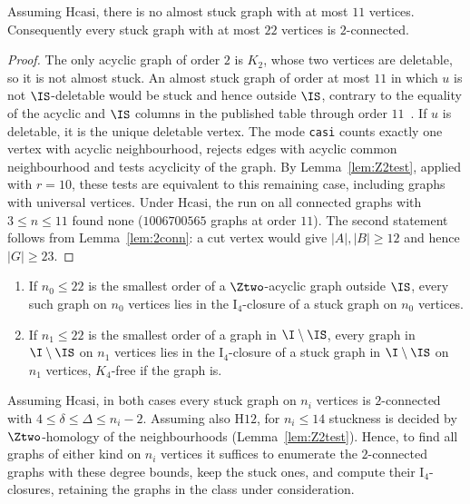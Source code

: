 \begin{proposition}\label{prop:almost}
Assuming $\mathrm{Hcasi}$, there is no almost stuck graph with at most $11$ vertices. Consequently every stuck graph with at most $22$ vertices is $2$-connected.
\end{proposition}
\begin{proof}
The only acyclic graph of order $2$ is $K_2$, whose two vertices are deletable, so it is not almost stuck. An almost stuck graph of order at most $11$ in which $u$ is not $\IS$-deletable would be stuck and hence outside $\IS$, contrary to the equality of the acyclic and $\IS$ columns in the published table through order $11$~\cite[Table~1]{DEFH2023}. If $u$ is deletable, it is the unique deletable vertex. The mode \texttt{casi} counts exactly one vertex with acyclic neighbourhood, rejects edges with acyclic common neighbourhood and tests acyclicity of the graph. By Lemma~\ref{lem:Z2test}, applied with $r=10$, these tests are equivalent to this remaining case, including graphs with universal vertices. Under $\mathrm{Hcasi}$, the run on all connected graphs with $3\le n\le11$ found none ($\num{1006700565}$ graphs at order $11$). The second statement follows from Lemma~\ref{lem:2conn}: a cut vertex would give $|A|,|B|\ge12$ and hence $|G|\ge23$.
\end{proof}

\begin{theorem}[Reduction]\label{thm:C}
\begin{enumerate}[label=(\roman*)]
\item If $n_0\le 22$ is the smallest order of a $\Ztwo$-acyclic graph outside $\IS$, every such graph on $n_0$ vertices lies in the $\mathrm{I}_4$-closure of a stuck graph on $n_0$ vertices.
\item If $n_1\le 22$ is the smallest order of a graph in $\I\setminus\IS$, every graph in $\I\setminus\IS$ on $n_1$ vertices lies in the $\mathrm{I}_4$-closure of a stuck graph in $\I\setminus\IS$ on $n_1$ vertices, $K_4$-free if the graph is.
\end{enumerate}
Assuming $\mathrm{Hcasi}$, in both cases every stuck graph on $n_i$ vertices is $2$-connected with $4\le\delta\le\Delta\le n_i-2$. Assuming also $\mathrm{H12}$, for $n_i\le14$ stuckness is decided by $\Ztwo$-homology of the neighbourhoods (Lemma~\ref{lem:Z2test}). Hence, to find all graphs of either kind on $n_i$ vertices it suffices to enumerate the $2$-connected graphs with these degree bounds, keep the stuck ones, and compute their $\mathrm{I}_4$-closures, retaining the graphs in the class under consideration.
\end{theorem}

